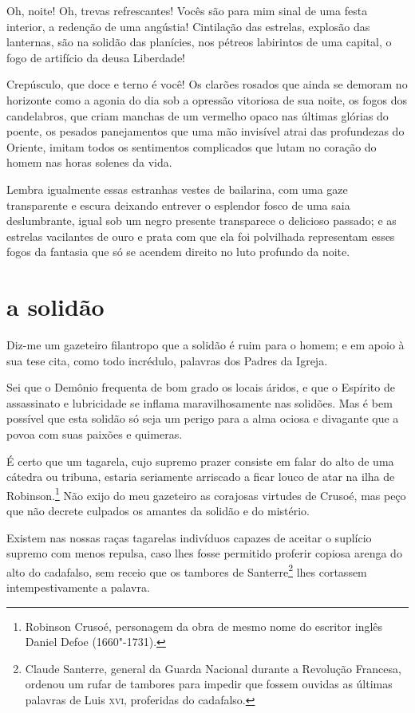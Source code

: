 Oh, noite! Oh, trevas refrescantes! Vocês são para mim sinal de uma
festa interior, a redenção de uma angústia! Cintilação das
estrelas, explosão das lanternas, são na solidão das
planícies, nos pétreos labirintos de uma capital, o fogo de artifício da
deusa Liberdade!

Crepúsculo, que doce e terno é você! Os clarões rosados que ainda se
demoram no horizonte como a agonia do dia sob a opressão
vitoriosa de sua noite, os fogos dos candelabros, que criam manchas de
um vermelho opaco nas últimas glórias do poente, 
os pesados panejamentos que uma mão invisível atrai das profundezas do Oriente,
imitam todos os sentimentos complicados que lutam no coração do homem
nas horas solenes da vida.

Lembra igualmente essas estranhas vestes de bailarina, com uma
gaze transparente e escura deixando entrever o esplendor fosco de
uma saia deslumbrante, igual sob um negro presente transparece o delicioso
passado; e as estrelas vacilantes de ouro e prata com que ela foi
polvilhada representam esses fogos da fantasia que só se acendem direito
no luto profundo da noite.

\quebra\section[A solidão]{a solidão}

Diz-me um gazeteiro filantropo que a solidão é ruim para o homem; e em
apoio à sua tese cita, como todo incrédulo, palavras dos Padres
da Igreja.

Sei que o Demônio frequenta de bom grado os locais áridos, e que o
Espírito de assassinato e lubricidade se inflama maravilhosamente 
nas solidões. Mas é bem possível que esta solidão só seja um perigo
para a alma ociosa e divagante que a povoa com suas paixões e quimeras.

É certo que um tagarela, cujo supremo prazer consiste em falar do alto
de uma cátedra ou tribuna, estaria seriamente arriscado a
ficar louco de atar na ilha de Robinson.\protect\footnote{ Robinson 
Crusoé, personagem da obra de mesmo nome do escritor inglês Daniel Defoe (1660"-1731).} Não exijo
do meu gazeteiro as corajosas virtudes de Crusoé, mas peço que não
decrete culpados os amantes da solidão e do mistério.

Existem nas nossas raças tagarelas indivíduos capazes de aceitar o suplício supremo com menos
repulsa, caso lhes fosse permitido proferir copiosa arenga do
alto do cadafalso, sem receio que os tambores de
Santerre\protect\footnote{  Claude Santerre, general da Guarda Nacional durante a Revolução
Francesa, ordenou um rufar de tambores para impedir que fossem ouvidas
as últimas palavras de Luis \textsc{xvi}, proferidas do cadafalso.} lhes cortassem intempestivamente a palavra.

